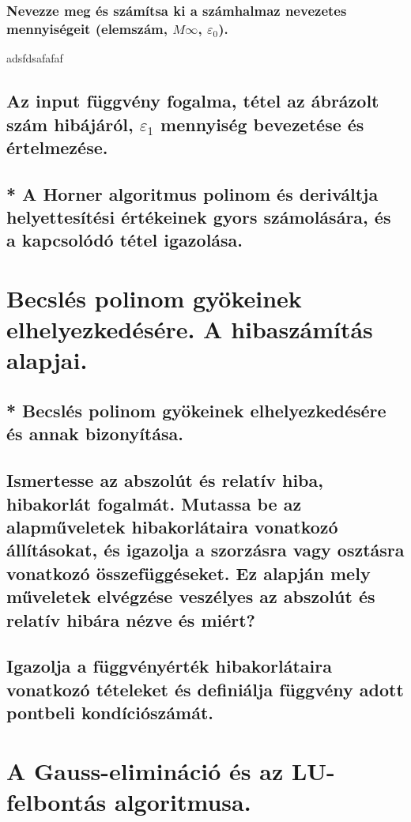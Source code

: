 \documentclass{article}
\begin{document}
            \subsubsection{Nevezze meg és számítsa ki a számhalmaz nevezetes mennyiségeit (elemszám, $M\infty$, $\varepsilon_0$).}

            adsfdsafafaf


        \subsection{Az input függvény fogalma, tétel az ábrázolt szám hibájáról, $\varepsilon_1$ mennyiség bevezetése és értelmezése.}
        
        
        \subsection{* A Horner algoritmus polinom és deriváltja helyettesítési értékeinek gyors számolására, és a kapcsolódó tétel igazolása.}


    \section{Becslés polinom gyökeinek elhelyezkedésére. A hibaszámítás alapjai.}
        \subsection{* Becslés polinom gyökeinek elhelyezkedésére és annak bizonyítása.}
        \subsection{Ismertesse az abszolút és relatív hiba, hibakorlát fogalmát. Mutassa be az alapműveletek hibakorlátaira vonatkozó állításokat, és igazolja a szorzásra vagy osztásra vonatkozó összefüggéseket. Ez alapján mely műveletek elvégzése veszélyes az abszolút és relatív hibára nézve és miért?}
        \subsection{Igazolja a függvényérték hibakorlátaira vonatkozó tételeket és definiálja függvény adott pontbeli kondíciószámát.}


    \section{A Gauss-elimináció és az LU-felbontás algoritmusa.}
\end{document}
